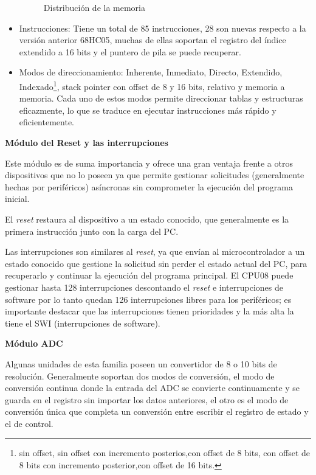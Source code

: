 \documentclass[12pt]{article}
\begin{document}
\begin{itemize}
\begin{figure}[h]
        \caption{Distribución de la memoria}
        \label{fig:memory_distribution}
    \end{figure}
    \item Instrucciones: Tiene un  total de 85 instrucciones, 28 son nuevas respecto a la versión anterior 68HC05, muchas de ellas soportan el registro del índice extendido a 16 bits y el puntero de pila se puede recuperar.
    \item Modos de direccionamiento: Inherente, Inmediato, Directo, Extendido, Indexado\footnote{sin offset, sin offset con incremento posterios,con offset de 8 bits, con offset de 8 bits con incremento posterior,con offset de 16 bits.}, stack pointer con offset de 8 y 16 bits, relativo y memoria a memoria. Cada uno de estos modos permite direccionar tablas y estructuras eficazmente, lo que se traduce en ejecutar instrucciones más rápido y eficientemente.
\end{itemize} 

{\large{\textbf{Módulo del Reset y las interrupciones}}}

Este módulo es de suma importancia y ofrece una gran ventaja frente a otros dispositivos que no lo poseen ya que permite gestionar solicitudes (generalmente hechas por periféricos) asíncronas sin comprometer la ejecución del programa inicial. 

El \textit{reset} restaura al dispositivo a un estado conocido, que generalmente es la primera instrucción junto con la carga del PC. 

Las interrupciones son similares al \textit{reset}, ya que envían al microcontrolador a un estado conocido que gestione la solicitud sin perder el estado actual del PC, para recuperarlo y continuar la ejecución del programa principal. El CPU08 puede gestionar hasta 128 interrupciones descontando el \textit{reset} e interrupciones de software por lo tanto quedan 126 interrupciones libres para los periféricos; es importante destacar que las interrupciones tienen prioridades y la más alta la tiene el SWI (interrupciones de software).


{\large{\textbf{Módulo ADC}}}

Algunas unidades de esta familia poseen un convertidor de 8 o 10 bits de resolución. Generalmente soportan dos modos de conversión, el modo de conversión continua donde la entrada del ADC se convierte continuamente y se guarda en el registro sin importar los datos anteriores, el otro es el modo de conversión única que completa un conversión entre escribir el registro de estado y el de control.
\end{document}

